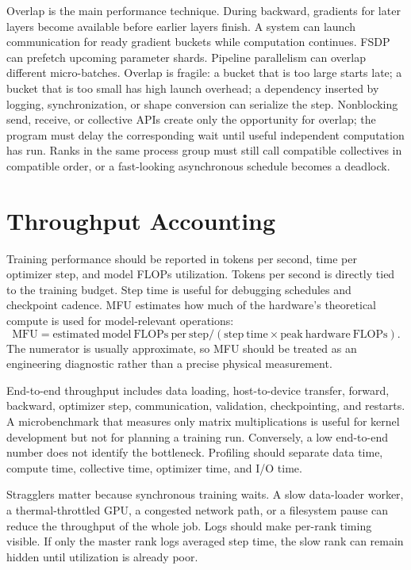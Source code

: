 Overlap is the main performance technique. During backward, gradients for later layers become available before earlier layers finish. A system can launch communication for ready gradient buckets while computation continues. FSDP can prefetch upcoming parameter shards. Pipeline parallelism can overlap different micro-batches. Overlap is fragile: a bucket that is too large starts late; a bucket that is too small has high launch overhead; a dependency inserted by logging, synchronization, or shape conversion can serialize the step. Nonblocking send, receive, or collective APIs create only the opportunity for overlap; the program must delay the corresponding wait until useful independent computation has run. Ranks in the same process group must still call compatible collectives in compatible order, or a fast-looking asynchronous schedule becomes a deadlock.

\section{Throughput Accounting}
\label{sec:throughput-accounting}

Training performance should be reported in tokens per second, time per optimizer step, and model FLOPs utilization. Tokens per second is directly tied to the training budget. Step time is useful for debugging schedules and checkpoint cadence. MFU estimates how much of the hardware's theoretical compute is used for model-relevant operations:
\begin{equation}
  \mathrm{MFU}
  =
  \mathrm{estimated\ model\ FLOPs\ per\ step}/
  (\mathrm{step\ time}\times \mathrm{peak\ hardware\ FLOPs}).
\end{equation}
The numerator is usually approximate, so MFU should be treated as an engineering diagnostic rather than a precise physical measurement.

End-to-end throughput includes data loading, host-to-device transfer, forward, backward, optimizer step, communication, validation, checkpointing, and restarts. A microbenchmark that measures only matrix multiplications is useful for kernel development but not for planning a training run. Conversely, a low end-to-end number does not identify the bottleneck. Profiling should separate data time, compute time, collective time, optimizer time, and I/O time.

Stragglers matter because synchronous training waits. A slow data-loader worker, a thermal-throttled GPU, a congested network path, or a filesystem pause can reduce the throughput of the whole job. Logs should make per-rank timing visible. If only the master rank logs averaged step time, the slow rank can remain hidden until utilization is already poor.

